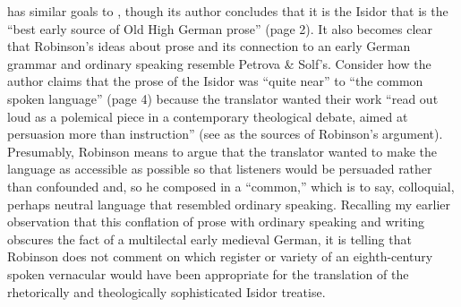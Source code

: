 \citet{Robinson1997} has similar goals to \citet{PetrovaSolf2009}, though its author concludes that it is the Isidor that is the “best early source of Old High German prose” (page 2). It also becomes clear that Robinson’s ideas about prose and its connection to an early German grammar and ordinary speaking resemble Petrova \& Solf’s. Consider how the author claims that the prose of the Isidor was “quite near” to “the common spoken language” (page 4) because the translator wanted their work “read out loud as a polemical piece in a contemporary theological debate, aimed at persuasion more than instruction” (see \textcites[29]{Nordmeyer1957}[27; 33]{Nordmeyer1958} as the sources of Robinson's argument). Presumably, Robinson means to argue that the translator wanted to make the language as accessible as possible so that listeners would be persuaded rather than confounded and, so he composed in a “common,” which is to say, colloquial, perhaps neutral language that resembled ordinary speaking. Recalling my earlier observation that this conflation of prose with ordinary speaking and writing obscures the fact of a multilectal early medieval German, it is telling that Robinson does not comment on which register or variety of an eighth-century spoken vernacular would have been appropriate for the translation of the rhetorically and theologically sophisticated Isidor treatise.\largerpage

